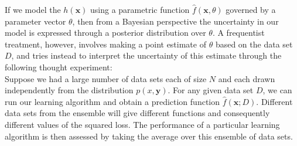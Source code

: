 \documentclass[twoside]{article}
\begin{document}
If we model the $h(\boldsymbol{x})$ using a parametric function $\hat{f}(\boldsymbol{x}, \theta)$ governed by a parameter vector $\theta$, then from a Bayesian perspective the uncertainty in our model is expressed through a posterior distribution over $\theta$. A frequentist treatment, however, involves making a point estimate of $\theta$ based on the data set $D$, and tries instead to interpret the uncertainty of this estimate through the following thought experiment:\\
Suppose we had a large number of data sets each of size $N$ and each drawn independently from the distribution $p(x, \boldsymbol{y})$. For any given data set $D$, we can run our learning algorithm and obtain a prediction function $\hat{f}(\boldsymbol{x}; D)$. Different data sets from the ensemble will give different functions and consequently different values of the squared loss. The performance of a particular learning algorithm is then assessed by taking the average over this ensemble of data sets.\medskip
\end{document}
